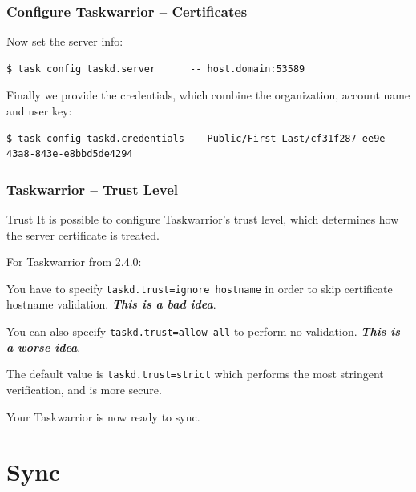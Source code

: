 \documentclass[t,handout]{beamer}
\begin{document}
\begin{frame}[fragile]\frametitle{Configure Taskwarrior -- Certificates}
    \vfill
    Now set the server info:
    \begin{lstlisting}
$ task config taskd.server      -- host.domain:53589\end{lstlisting}

    Finally we provide the credentials, which combine the organization, account name and user key:

    \begin{lstlisting}
$ task config taskd.credentials -- Public/First Last/cf31f287-ee9e-43a8-843e-e8bbd5de4294\end{lstlisting}
\end{frame}

\begin{frame}[fragile]\frametitle{Taskwarrior -- Trust Level}
    \vfill
    \begin{alertblock}{Trust}
        It is possible to configure Taskwarrior's trust level, which determines how the server certificate is treated.

        For Taskwarrior from 2.4.0:

         You have to specify \verb+taskd.trust=ignore hostname+ in order to skip certificate hostname validation. \textbf{\emph{This is a bad idea}}.

         You can also specify \verb+taskd.trust=allow all+ to perform no validation. \textbf{\emph{This is a worse idea}}.

         The default value is \verb+taskd.trust=strict+ which performs the most stringent verification, and is more secure.
    \end{alertblock}

    Your Taskwarrior is now ready to sync.
\end{frame}

\section{Sync}
\end{document}
